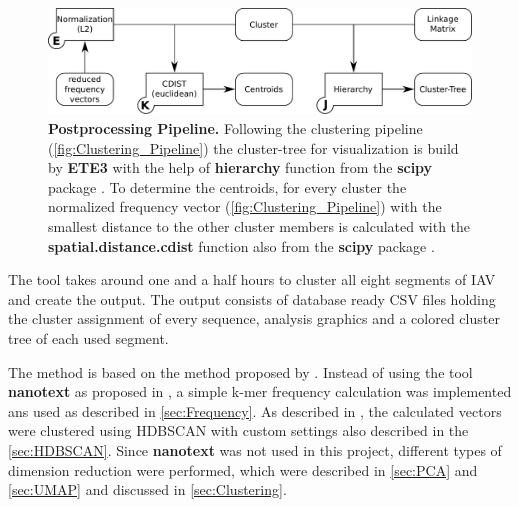 \begin{figure}[!hbt]
    \centering
    \includegraphics[width=\textwidth]{Graphics/Tree.pdf}
    \caption[Postprocessing Pipeline]{\textbf{Postprocessing Pipeline.} Following the clustering pipeline (\autoref{fig:Clustering_Pipeline}) the cluster-tree for visualization is build by \textbf{ETE3} with the help of \textbf{hierarchy} function from the \textbf{scipy} package \autocite{huerta-cepas_ete_2016, scipy_10_contributors_scipy_2020}. To determine the centroids, for every cluster the normalized frequency vector (\autoref{fig:Clustering_Pipeline}) with the smallest distance to the other cluster members is calculated with the \textbf{spatial.distance.cdist} function also from the \textbf{scipy} package \autocite{scipy_10_contributors_scipy_2020}.}
    \label{fig:Tree_Pipeline}
\end{figure}

The tool takes around one and a half hours to cluster all eight segments of \gls{IAV} and create the output. The output consists of database ready CSV files holding the cluster assignment of every sequence, analysis graphics and a colored cluster tree of each used segment.

The method is based on the method proposed by \autocite{viehweger_addressing_2019}. Instead of using the tool \textbf{nanotext} as proposed in \autocite{viehweger_encoding_2019}, a simple k-mer frequency calculation was implemented ans used as described in \autoref{sec:Frequency}. As described in \textcite{viehweger_addressing_2019}, the calculated vectors were clustered using \gls{HDBSCAN} with custom settings also described in the \autoref{sec:HDBSCAN}. Since \textbf{nanotext} was not used in this project, different types of dimension reduction were performed, which were described in \autoref{sec:PCA} and \autoref{sec:UMAP} and discussed in \autoref{sec:Clustering}.%

\nopagebreak[1]













